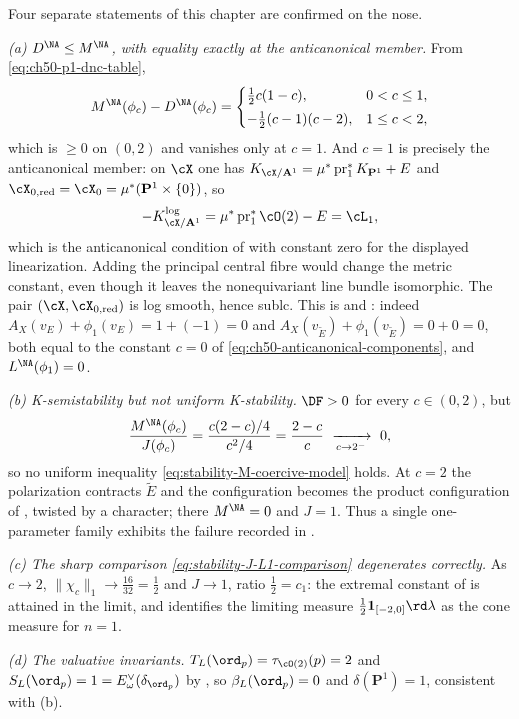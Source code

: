 \begin{remark}
\label{rem:ch50-p1-dnc-checks}
Four separate statements of this chapter are confirmed on the nose.

\emph{(a) $D^{\NA}\le M^{\NA}$, with equality exactly at the
anticanonical member.}  From \eqref{eq:ch50-p1-dnc-table},
\[
 M^{\NA}(\phi_c)-D^{\NA}(\phi_c)
 =\begin{cases}
   \tfrac12c(1-c), & 0<c\le1,\\[1mm]
   -\tfrac12(c-1)(c-2), & 1\le c<2,
  \end{cases}
\]
which is $\ge0$ on $(0,2)$ and vanishes only at $c=1$.  And
$c=1$ is precisely the anticanonical member: on $\cX$ one has
$K_{\cX/\mathbf A^1}=\mu^*\operatorname{pr}_1^*K_{\mathbf P^1}+E$ and
$\cX_{0,\mathrm{red}}=\cX_0=\mu^*(\mathbf P^1\times\{0\})$, so
\[
 -K^{\log}_{\cX/\mathbf A^1}
 =\mu^*\operatorname{pr}_1^*\cO(2)-E
 =\cL_1 ,
\]
which is the anticanonical condition of 
with constant zero for the displayed linearization.  Adding the principal
central fibre would change the metric constant, even though it leaves
the nonequivariant line bundle isomorphic.
The pair
$(\cX,\cX_{0,\mathrm{red}})$ is log smooth, hence sublc.  This is
 and
: indeed
$A_X(v_E)+\phi_1(v_E)=1+(-1)=0$ and
$A_X(v_{\widetilde E})+\phi_1(v_{\widetilde E})=0+0=0$, both equal to
the constant $c=0$ of \eqref{eq:ch50-anticanonical-components}, and
$L^{\NA}(\phi_1)=0$.

\emph{(b) K-semistability but not uniform K-stability.}  $\DF>0$ for
every $c\in(0,2)$, but
\[
 \frac{M^{\NA}(\phi_c)}{J(\phi_c)}
 =\frac{c(2-c)/4}{c^2/4}=\frac{2-c}{c}\ \xrightarrow[c\to2^-]{}\ 0 ,
\]
so no uniform inequality \eqref{eq:stability-M-coercive-model} holds.  At
$c=2$ the polarization contracts $\widetilde E$ and the configuration
becomes the product configuration of ,
twisted by a character; there $M^{\NA}=0$ and $J=1$.  Thus a single
one-parameter family exhibits the failure recorded in
.

\emph{(c) The sharp comparison \eqref{eq:stability-J-L1-comparison}
degenerates correctly.}  As $c\to2$,
$\|\chi_c\|_1\to\frac{16}{32}=\frac12$ and $J\to1$, ratio
$\frac12=c_1$: the extremal constant of  is attained
in the limit, and  identifies the limiting
measure $\frac12\mathbf 1_{[-2,0]}\rd\lambda$ as the cone measure for
$n=1$.

\emph{(d) The valuative invariants.}  $T_L(\ord_p)=\tau_{\cO(2)}(p)=2$
and $S_L(\ord_p)=1=E^\vee_\omega(\delta_{\ord_p})$ by
, so
$\beta_L(\ord_p)=0$ and $\delta(\mathbf P^1)=1$, consistent with (b).
\end{remark}

